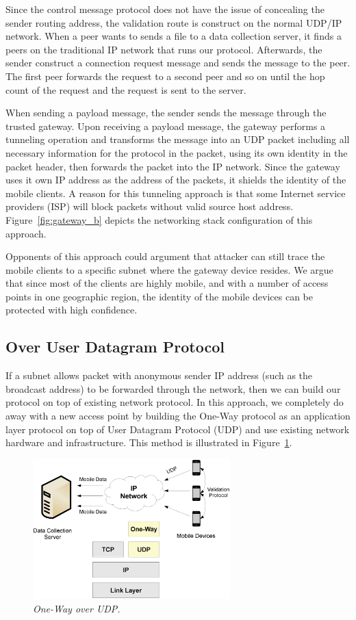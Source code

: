 Since the control message protocol does not have the issue of concealing
the sender routing address, the validation route is construct on the
normal UDP/IP network. When a peer wants to sends a file to a data
collection server, it finds a peers on the traditional IP network that
runs our protocol. Afterwards, the sender construct a connection request
message and sends the message to the peer. The first peer forwards the
request to a second peer and so on until the hop count of the request and
the request is sent to the server.

When sending a payload message, the sender sends the message through the
trusted gateway. Upon receiving a payload message, the gateway performs a
tunneling operation and transforms the message into an UDP packet including
all necessary information for the protocol in the packet, using its own
identity in the packet header, then forwards the packet into the IP network.
Since the gateway uses it own
IP address as the address of the packets, it shields the identity of the mobile
clients. A reason for this tunneling approach is that some Internet service
providers (ISP) will block packets without valid source host address.
Figure~\ref{fig:gateway_b}
depicts the networking stack configuration of this approach.

Opponents of this approach could argument that attacker can still
trace the mobile clients to a
specific subnet where the gateway device resides. We argue that since most of
the clients are highly mobile, and with a number of access points in one
geographic region, the identity of the mobile devices can be protected with high
confidence.

\subsection{Over User Datagram Protocol}
If a subnet allows packet with anonymous sender IP address (such as the
broadcast address) to be forwarded through the network, then we can build
our protocol on top of existing network protocol.
In this approach, we completely do away with a new access point by building
the One-Way protocol as an application layer protocol on top of User Datagram
Protocol (UDP) and use existing network hardware and infrastructure. This
method is illustrated in Figure~\ref{fig:imp-udp}.

\begin{figure}[h]
\begin{center}
\includegraphics[width=3in]{figure4.eps}
\caption{\small \sl One-Way over UDP.\label{fig:imp-udp}}
\end{center}
\end{figure}

